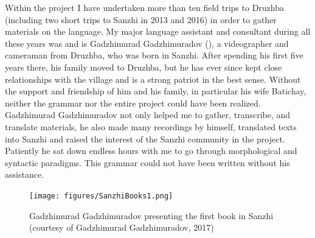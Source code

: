 Within the project I have undertaken more than ten field trips to Druzhba (including two short trips to Sanzhi in 2013 and 2016) in order to gather materials on the language. My major language assistant and consultant during all these years was and is Gadzhimurad Gadzhimuradov (), a videographer and cameraman from Druzhba, who was born in Sanzhi. After spending his first five years there, his family moved to Druzhba, but he has ever since kept close relationships with the village and is a strong patriot in the best sense. Without the support and friendship of him and his family, in particular his wife Batichay, neither the grammar nor the entire project could have been realized. Gadzhimurad Gadzhimuradov not only helped me to gather, transcribe, and translate materials, he also made many recordings by himself, translated texts into Sanzhi and raised the interest of the Sanzhi community in the project. Patiently he sat down endless hours with me to go through morphological and syntactic paradigms. This grammar could not have been written without his assistance.



\begin{figure}
	\caption{Gadzhimurad Gadzhimuradov presenting the first book in Sanzhi (courtesy of Gadzhimurad Gadzhimuradov, 2017)}
	\label{fig:SanzhiBook}
	\texttt{[image: figures/SanzhiBooks1.png]}
\end{figure}
